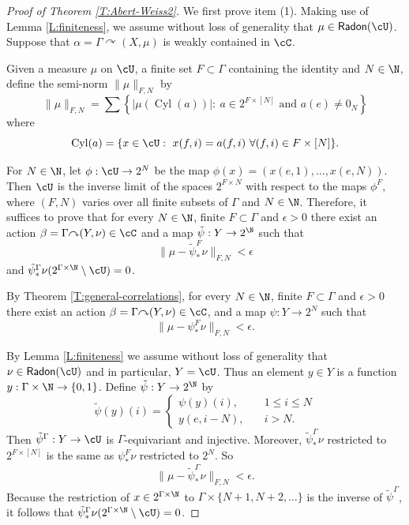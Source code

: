 \documentclass[12pt]{article}
\theoremstyle{plain}
\theoremstyle{definition}
\theoremstyle{remark}
\newcommand{\G}{\Gamma}
\newcommand{\eps}{\epsilon}
\renewcommand\a{\alpha}
\renewcommand\b{\beta}
\newcommand\Cyl{\operatorname{Cyl}}
\newcommand\Radon{\mathsf{Radon}}
\def\cc{{\curvearrowright}}
\begin{document}
\begin{proof}[Proof of Theorem \ref{T:Abert-Weiss2}]

We first prove item (1). Making use of Lemma \ref{L:finiteness}, we assume without loss of generality that $\mu\in\Radon(\cU)$. Suppose that $\a=\G\cc (X,\mu)$ is weakly contained in $\cC$. 

Given a measure $\mu$ on $\cU$, a finite set $F \subset \G$ containing the identity and $N \in \N$, define the semi-norm $\|\mu\|_{F,N}$ by
$$\|\mu\|_{F,N} = \sum \left\{ |\mu(\Cyl(a))| :~ a \in 2^{F\times [N]} \textrm{ and } a(e)\ne 0_N\right\}$$
where
$$\Cyl(a)=\{x\in \cU:~x(f,i)=a(f,i) ~\forall (f,i) \in F\times [N]\}.$$


For $N\in\N$, let $\phi:\cU\to 2^N$ be the map $\phi(x)=(x(e,1),\ldots, x(e,N))$. Then $\cU$ is the inverse limit of the spaces $2^{F\times N}$ with respect to the maps $\phi^F$, where $(F,N)$ varies over all finite subsets of $\G$ and $N \in \N$. Therefore, it suffices to prove that for every $N \in \N$, finite $F \subset \G$ and $\eps>0$ there exist an action $\b = \G \cc (Y,\nu) \in \cC$ and a map $\tilde{\psi}:Y \to 2^\N$ such that 
$$\|\mu - \tilde{\psi}^F_*\nu\|_{F,N} < \eps$$
and $\tilde{\psi}^\G_*\nu(2^{\G\times \N}\setminus \cU)=0$.



By Theorem \ref{T:general-correlations}, for every $N \in \N$, finite $F \subset \G$ and $\eps>0$ there exist an action $\b = \G \cc (Y,\nu) \in \cC$, and a map $\psi:Y \to 2^N$ such that
$$\|\mu - \psi^F_*\nu\|_{F,N} < \eps.$$

By Lemma \ref{L:finiteness} we assume without loss of generality that $\nu\in\Radon(\cU)$ and in particular, $Y=\cU$. Thus an element $y\in Y$ is a function $y:\G\times \N\to\{0,1\}$. Define $\tilde{\psi}:Y \to 2^\N$ by
\begin{displaymath}
    \tilde{\psi}(y)(i) = 
    \begin{cases}
        \psi(y)(i), & 1\le i \le N \\
    y(e,i-N),\quad & i>N.
    \end{cases} 
\end{displaymath}
Then $\tilde{\psi}^\G:Y\to \cU$ is $\G$-equivariant and injective. Moreover, $\tilde{\psi}^\G_*\nu$ restricted to $2^{F\times [N]}$ is the same as $\psi^F_*\nu$ restricted to $2^N$. So
$$\|\mu - \tilde{\psi}^\G_*\nu\|_{F,N} < \eps.$$
Because the restriction of $x\in 2^{\G \times \N}$ to $\G \times \{N+1,N+2,\ldots \}$ is the inverse of $\tilde{\psi}^\G$, it follows that $\tilde{\psi}^\G_*\nu(2^{\G\times \N}\setminus \cU)=0$.


\end{proof}
\end{document}
